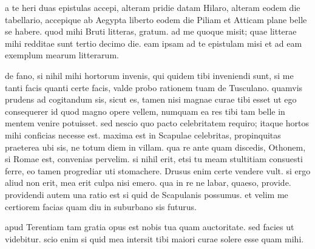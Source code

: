 


 a te heri duas epistulas accepi, alteram pridie datam Hilaro, alteram eodem die tabellario, accepique ab Aegypta liberto eodem die Piliam et Atticam plane belle se habere. quod mihi Bruti litteras, gratum. ad me quoque misit; quae litterae mihi redditae sunt tertio decimo die. eam ipsam ad te epistulam misi et ad eam exemplum mearum litterarum.

 de fano, si nihil mihi hortorum invenis, qui quidem tibi inveniendi sunt, si me tanti facis quanti certe facis, valde probo rationem tuam de Tusculano. quamvis prudens ad cogitandum sis, sicut es, tamen nisi magnae curae tibi esset ut ego consequerer id quod magno opere vellem, numquam ea res tibi tam belle in mentem venire potuisset. sed nescio quo pacto celebritatem requiro; itaque hortos mihi conficias necesse est. maxima est in Scapulae celebritas, propinquitas praeterea ubi sis, ne totum diem in villam. qua re ante quam discedis, Othonem, si Romae est, convenias pervelim. si nihil erit, etsi tu meam stultitiam consuesti ferre, eo tamen progrediar uti stomachere. Drusus enim certe vendere vult. si ergo aliud non erit, mea erit culpa nisi emero. qua in re ne labar, quaeso, provide. providendi autem una ratio est si quid de Scapulanis possumus. et velim me certiorem facias quam diu in suburbano sis futurus.

 apud Terentiam tam gratia opus est nobis tua quam auctoritate. sed facies ut videbitur. scio enim si quid mea intersit tibi maiori curae solere esse quam mihi.
